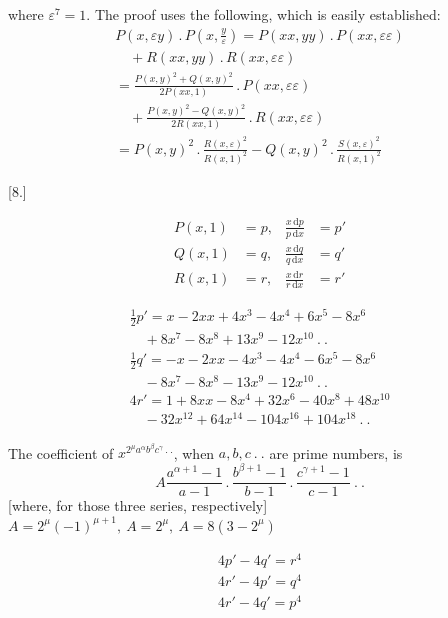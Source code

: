 where $\varepsilon^7=1$. The proof uses the following, which is easily established:
\[
\begin{gathered}
P(x,\varepsilon y)\,.\,P(x,\tfrac{y}{\varepsilon})
=P(xx,yy)\,.\,P(xx,\varepsilon\varepsilon)\\[8pt]\quad{}+R(xx,yy)\,.\,R(xx,\varepsilon\varepsilon)\\[8pt]
=\frac{P(x,y)^2+Q(x,y)^2}{2P(xx,1)}\,.\,P(xx,\varepsilon\varepsilon)
\\[8pt]\quad{}+\frac{P(x,y)^2-Q(x,y)^2}{2R(xx,1)}\,.\,R(xx,\varepsilon\varepsilon)\\[8pt]
=P(x,y)^2\,.\,\frac{R(x,\varepsilon)^2}{R(x,1)^2}
-Q(x,y)^2\,.\,\frac{S(x,\varepsilon)^2}{R(x,1)^2}
\end{gathered}
\]

\par\medskip{}\centerline{[8.]}\nobreak\smallskip
\[
\begin{aligned}
P(x,1)&=p, & \frac{x\,\mathrm{d}p}{p\,\mathrm{d}x}&=p'\\[8pt]
Q(x,1)&=q, & \frac{x\,\mathrm{d}q}{q\,\mathrm{d}x}&=q'\\[8pt]
R(x,1)&=r, & \frac{x\,\mathrm{d}r}{r\,\mathrm{d}x}&=r'
\end{aligned}
\]

\[
\begin{gathered}
\tfrac12p'=x-2xx+4x^3-4x^4+6x^5-8x^6\\[8pt]\quad{}+8x^7-8x^8+13x^9-12x^{10}\ .\ .\\[8pt]
\tfrac12q'=-x-2xx-4x^3-4x^4-6x^5-8x^6\\[8pt]\quad{}-8x^7-8x^8-13x^9-12x^{10}\ .\ .\\[8pt]
4r'=1+8xx-8x^4+32x^6-40x^8+48x^{10}\\[8pt]\quad{}-32x^{12}+64x^{14}-104x^{16}+104x^{18}\ .\ .
\end{gathered}
\]

The coefficient of $x^{2^\mu a^\alpha b^{\beta}c^\gamma\ .\ .}$, when $a,b,c\ .\ .$ are prime numbers, is
\[
A\frac{a^{\alpha+1}-1}{a-1}\,.\,\frac{b^{\beta+1}-1}{b-1}\,.\,\frac{c^{\gamma+1}-1}{c-1}\ .\ .
\]
[where, for those three series, respectively]
$A=2^\mu(-1)^{\mu+1},\ A=2^\mu,\ A=8(3-2^\mu)$


\[
\begin{gathered}
4p'-4q'=r^4\\[8pt]
4r'-4p'=q^4\\[8pt]
4r'-4q'=p^4
\end{gathered}
\]

